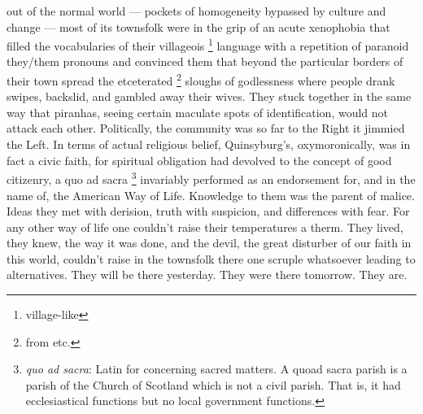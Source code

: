 out of the normal world --- pockets of homogeneity bypassed by culture and 
change --- most of its townsfolk were in the grip of an acute xenophobia 
that filled the vocabularies of their villageois
\footnote{ village-like}
language with a repetition of paranoid they/them pronouns and convinced them
that beyond the particular borders of their town spread the etceterated 
\footnote{ from etc.}
sloughs
of godlessness where people drank swipes, 
backslid, 
and gambled away their
wives. They stuck together in the same way that piranhas, 
seeing certain maculate 
spots of identification, would not attack each other. Politically, the
community was so far to the Right it jimmied 
the Left. In terms of actual religious belief, Quinsyburg's, oxymoronically, 
was in fact a civic faith, for spiritual obligation had devolved 
to the concept of good citizenry, a quo ad sacra 
\footnote{ \textit{quo ad sacra}: Latin for concerning sacred matters. A quoad
sacra parish is a parish of the Church of Scotland which is not a civil parish.
That is, it had ecclesiastical functions but no local government functions.
}
invariably performed as an endorsement for, and in the name of, the
American Way of Life. Knowledge to them was the parent of malice. 
Ideas they met with derision, 
truth with suspicion, and differences with fear. For any other
way of life one couldn't raise their temperatures a therm. 
They lived, they
knew, the way it was done, and the devil, the great disturber of our faith in
this world, couldn't raise in the townsfolk there one scruple whatsoever leading
to alternatives. They will be there yesterday. They were there tomorrow. They
are.

